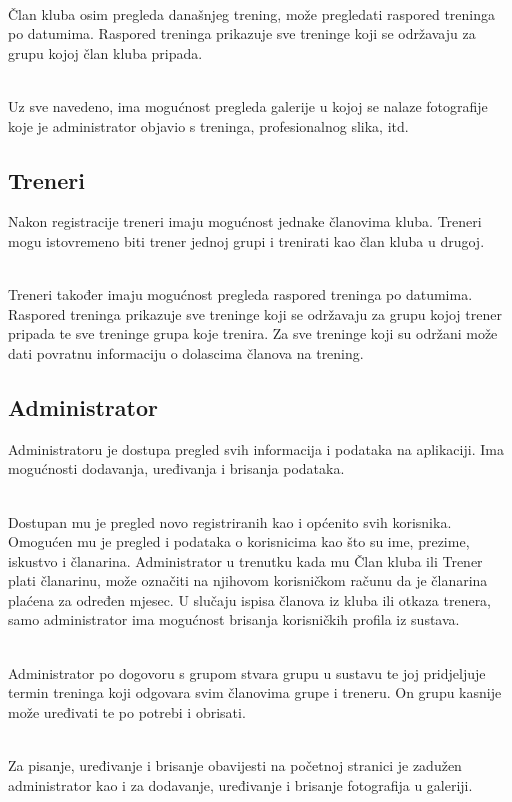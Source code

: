 \documentclass[times, utf8, zavrsni]{fer}
\begin{document}
		\\Član kluba osim  pregleda današnjeg trening, može pregledati raspored treninga po datumima. Raspored treninga prikazuje sve treninge koji se održavaju za grupu kojoj član kluba pripada. 
		
		\\Uz sve navedeno, ima mogućnost pregleda galerije u kojoj se nalaze fotografije koje je administrator objavio s treninga, profesionalnog slika, itd. 
		
		\subsection{Treneri}
		Nakon registracije treneri imaju mogućnost jednake članovima kluba. Treneri mogu istovremeno biti trener jednoj grupi i trenirati kao član kluba u drugoj.
		
		\\Treneri također imaju mogućnost pregleda raspored treninga po datumima. Raspored treninga prikazuje sve treninge koji se održavaju za grupu kojoj trener pripada te sve treninge grupa koje trenira. Za sve treninge koji su održani može dati povratnu informaciju o dolascima članova na trening.
	
		\subsection{Administrator}
		Administratoru je dostupa pregled svih informacija i podataka na aplikaciji. Ima mogućnosti dodavanja, uređivanja i brisanja podataka.
		
		\\Dostupan mu je pregled novo registriranih kao i općenito svih korisnika. Omogućen mu je pregled i podataka o korisnicima kao što su ime, prezime, iskustvo i članarina. Administrator u trenutku kada mu Član kluba ili Trener plati članarinu, može označiti na njihovom korisničkom računu da je članarina plaćena za određen mjesec. U slučaju ispisa članova iz kluba ili otkaza trenera, samo administrator ima mogućnost brisanja korisničkih profila iz sustava.
		
		\\Administrator po dogovoru s grupom stvara grupu u sustavu te joj pridjeljuje termin treninga koji odgovara svim članovima grupe i treneru. On grupu kasnije može uređivati te po potrebi i obrisati.
		
		\\Za pisanje, uređivanje i brisanje obavijesti na početnoj stranici je zadužen administrator kao i za dodavanje, uređivanje i brisanje fotografija u galeriji.
		
\end{document}
